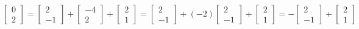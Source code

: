 \documentclass{ximera}
\begin{document}
$$\begin{bmatrix}0\\2\end{bmatrix}=\begin{bmatrix}2\\-1\end{bmatrix}+ \begin{bmatrix}-4\\2\end{bmatrix}+ \begin{bmatrix}2\\1\end{bmatrix}=\begin{bmatrix}2\\-1\end{bmatrix}+ (-2)\begin{bmatrix}2\\-1\end{bmatrix}+ \begin{bmatrix}2\\1\end{bmatrix}=-\begin{bmatrix}2\\-1\end{bmatrix}+ \begin{bmatrix}2\\1\end{bmatrix}$$
\end{document}
